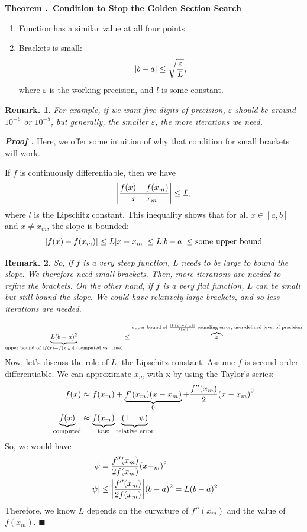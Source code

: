 \documentclass[12pt, a4paper]{article}
\newcounter{index}[subsection]
\newenvironment*{thm}[1]{\begin{tcolorbox}\par\noindent\textbf{Theorem \thesubsection.\stepcounter{index}\theindex\ #1} \par}{\par\end{tcolorbox}}
\newcounter{nprf}[subsection]
\newenvironment*{prf}{\par\indent\textbf{\textit{Proof \stepcounter{nprf}\thenprf.}}}{\hfill$\blacksquare$\par}
\newtheorem{rmk}{Remark.}[section]
\def\epsilon{\varepsilon}
\begin{document}
\begin{thm}{Condition to Stop the Golden Section Search}
	\begin{enumerate}
		\item Function has a similar value at all four points
		\item Brackets is small: \[\qty|b-a|\leq\sqrt{\dfrac{\epsilon}{L}},\] where $\epsilon$ is the working precision, and $l$ is some constant. 
	\end{enumerate}	
	\begin{rmk}
		For example, if we want five digits of precision, $\epsilon$ should be around $10^{-6}$ or $10^{-5}$, but generally, the smaller $\epsilon$, the more iterations we need. 
	\end{rmk}
\end{thm}
\begin{prf}
	Here, we offer some intuition of why that condition for small brackets will work. \par If $f$ is continuously differentiable, then we have \[\qty|\dfrac{f(x)-f\qty(x_m)}{x-x_m}|\leq L,\] where $l$ is the Lipschitz constant. This inequality shows that for all $x\in[a,b]$ and $x\neq x_m$, the slope is bounded: \[\qty|f(x)-f(x_m)|\leq L\qty|x-x_m|\leq L\abs{b-a}\leq\text{some upper bound}\]
	\begin{rmk}	
	So, if $f$ is a very steep function, $L$ needs to be large to bound the slope. We therefore need small brackets. Then, more iterations are needed to refine the brackets. On the other hand, if $f$ is a very flat function, $L$ can be small but still bound the slope. We could have relatively large brackets, and so less iterations are needed. 
	\end{rmk}\par 
	\[\underbrace{L(b-a)^2}_{\text{upper bound of }\qty|f(x)-f(x_m)|\text{ (computed vs. true)}}\leq\overbrace{\epsilon}^{\text{upper bound of }\frac{|F(x)-f(x)|}{|f(x)|}\text{ rounding error, user-defined level of precision}}\]
	Now, let's discuss the role of $L$, the Lipschitz constant. Assume $f$ is second-order differentiable. We can approximate $x_m$ with x by using the Taylor's series: \begin{align*}f(x)&\approx f(x_m)+\underbrace{f'(x_m)(x-x_m)}_{0}+\dfrac{f''(x_m)}{2}\qty(x-x_m)^2\\\underbrace{f(x)}_\text{computed}&\approx\underbrace{f(x_m)}_\text{true}\underbrace{\qty(1+\psi)}_\text {relative error}\end{align*} So, we would have \begin{align*}\psi&\equiv\dfrac{f''(x_m)}{2f(x_m)}(x-_m)^2\\\qty|\psi|&\leq\abs{\dfrac{f''(x_m)}{2f(x_m)}}(b-a)^2=L(b-a)^2\end{align*} Therefore, we know $L$ depends on the curvature of $f''(x_m)$ and the value of $f(x_m)$.
\end{prf}
\end{document}
